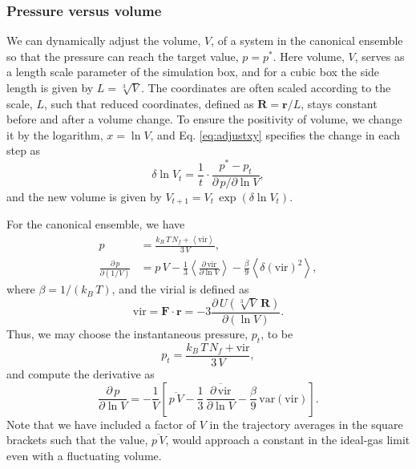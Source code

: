 \documentclass[reprint]{revtex4-1}
\begin{document}
\subsubsection{Pressure versus volume}

We can dynamically adjust the volume, $V$, of a system
in the canonical ensemble
so that the pressure can reach the target value, $p = p^*$.
%
%
Here volume, $V$, serves as a length scale parameter
of the simulation box,
and for a cubic box
the side length is given by $L = \sqrt[3]{V}$.
%
The coordinates are often scaled according to the scale, $L$,
such that reduced coordinates, defined as
$\mathbf R = \mathbf r / L$,
stays constant before and after a volume change.
%
To ensure the positivity of volume,
we change it by the logarithm, $x = \ln V$,
and Eq. \eqref{eq:adjustxy} specifies
the change in each step as
$$
\delta \ln V_t
=
\frac{1}{t} \cdot
\frac{ p^* - p_t }
     { \partial \, p / \partial \ln V }
,
$$
and the new volume is given by $V_{t+1} = V_t \, \exp(\delta \ln V_t)$.

For the canonical ensemble,
we have
%
\begin{align*}
  p
  &=
  \frac{
    k_B \, T \, N_f + \left\langle \mathrm{vir} \right\rangle
  } { 3 \, V }
  ,
  \\
  \frac{ \partial \, p } { \partial (1/V) }
  &=
  p \, V
  -
  \frac{1}{3} \left\langle
    \frac{ \partial \, \mathrm{vir} } { \partial \ln V }
  \right\rangle
  -
  \frac{\beta}{9} \left\langle
  \delta( \mathrm{vir} )^2
  \right\rangle
  ,
\end{align*}
%
where $\beta = 1/(k_B \, T)$, and
the virial is defined as
%
\begin{equation*}
  \mathrm{vir}
  =
  \mathbf F \cdot \mathbf r
  =
  -3 \frac{ \partial \, U\left( \sqrt[3]{V} \, \mathbf R \right) }
  { \partial (\ln V) }
  .
\end{equation*}
%
Thus, we may choose the instantaneous pressure, $p_t$,
to be
%
\begin{equation*}
  p_t
  =
  \frac{ k_B \, T \, N_f + \mathrm{vir} }
  { 3 \, V }
  ,
\end{equation*}
%
and compute the derivative as
%
\begin{equation*}
  \frac{ \partial \, p } { \partial \ln V }
  =
  - \frac{1}{V}
  \left[ \,
    \overline{ p \, V }
    - \frac{1}{3} \,
    \overline{ \frac{ \partial \, \mathrm{vir} } { \partial \ln V } }
    - \frac{\beta}{9} \, \mathrm{var} ( \mathrm{vir} )
  \right]
  .
\end{equation*}
%
Note that we have included a factor of $V$
in the trajectory averages in the square brackets
such that the value,
$\overline{p \, V}$,
would approach a constant in the ideal-gas limit
even with a fluctuating volume.
\end{document}
